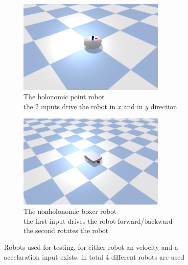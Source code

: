 \begin{figure}[H]
    \centering
    \begin{subfigure}{.5\textwidth}
    \centering
    \includegraphics[width=0.8\textwidth]{figures/point_robot.png}
    \caption{The holonomic point robot\\the 2 inputs drive the robot in $x$ and in $y$ direction}
    \label{subfig:example_point_robot}
    \end{subfigure}%
    \begin{subfigure}{.5\textwidth}
    \centering
    \includegraphics[width=0.8\textwidth]{figures/boxer_robot.png}
    \caption{The nonholonomic boxer robot\\the first input drives the robot forward/backward\\the second rotates the robot}
    \label{subfig:example_boxer_robot}
    \end{subfigure}%
    \caption{Robots used for testing, for either robot an velocity and a accelaration input exists, in total 4 different robots are used}
    \label{fig:example_robots}
\end{figure}

